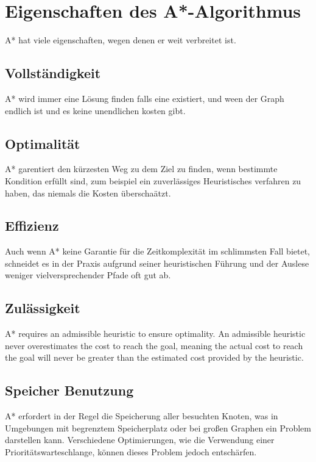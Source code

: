 \chapter{Eigenschaften des A*-Algorithmus}
A* hat viele eigenschaften, wegen denen er weit verbreitet ist.


\section{Vollständigkeit}

A* wird immer eine Lösung finden falls eine existiert, und ween der Graph endlich ist und es keine unendlichen kosten gibt.

\section{Optimalität}

A* garentiert den kürzesten Weg zu dem Ziel zu finden, wenn bestimmte Kondition erfüllt sind, zum beispiel ein zuverlässiges Heuristisches verfahren zu haben, das niemals die Kosten überschaätzt.


\section{Effizienz}
Auch wenn A* keine Garantie für die Zeitkomplexität im schlimmsten Fall bietet, schneidet es in der Praxis aufgrund seiner heuristischen Führung und der Auslese weniger vielversprechender Pfade oft gut ab.

\section{Zulässigkeit}
A* requires an admissible heuristic to ensure optimality. An admissible heuristic never overestimates the cost to reach the goal, meaning the actual cost to reach the goal will never be greater than the estimated cost provided by the heuristic.

\section{Speicher Benutzung}
A* erfordert in der Regel die Speicherung aller besuchten Knoten, was in Umgebungen mit begrenztem Speicherplatz oder bei großen Graphen ein Problem darstellen kann. Verschiedene Optimierungen, wie die Verwendung einer Prioritätswarteschlange, können dieses Problem jedoch entschärfen.